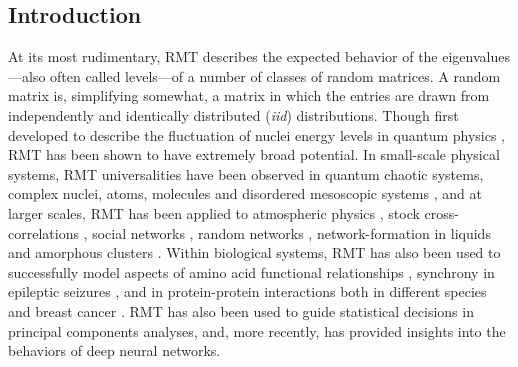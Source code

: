 \documentclass[12pt]{spieman}  %
\begin{document}
\begin{spacing}{2}

\section{Introduction}
\label{sect:intro}

At its most rudimentary, RMT describes the expected behavior of the
eigenvalues—also often called levels—of a number of classes of random
matrices\cite{andersonIntroductionRandomMatrices2010,
akemannOxfordHandbookRandom2011, mehtaRandomMatrices2004}. A random matrix is,
simplifying somewhat, a matrix in which the entries are drawn from
independently and identically distributed (\textit{iid}) distributions. Though
first developed to describe the fluctuation of nuclei energy levels in quantum
physics \cite{mehtaRandomMatrices2004, guhrRandommatrixTheoriesQuantum1998a},
RMT has been shown to have extremely broad potential. In small-scale physical
systems, RMT universalities have been observed in quantum chaotic systems,
complex nuclei, atoms, molecules and disordered mesoscopic systems
\cite{guhrRandommatrixTheoriesQuantum1998a, mehtaRandomMatrices2004,
brodyRandommatrixPhysicsSpectrum1981, beenakkerRandommatrixTheoryQuantum1997,
bohigasHigherOrderCorrelationsSpectra1985, wintgenLevelStatisticsQuantized1988,
pandeySkewOrthogonalPolynomialsUniversality2001}, and at larger scales, RMT has
been applied to atmospheric physics
\cite{santhanamStatisticsAtmosphericCorrelations2001}, stock cross-correlations
\cite{plerouRandomMatrixApproach2002}, social networks
\cite{jalanUncoveringRandomnessSuccess2014}, random networks
\cite{bandyopadhyayUniversalityComplexNetworks2007}, network-formation in
liquids\cite{sastrySpectralStatisticsInstantaneous2001,
matharooSpectralStatisticsQuenched2009} and amorphous clusters
\cite{sarkarUniversalityVibrationalSpectra2004,
matharooVibrationalSpectraAmorphous2005,
matharooUniversalityVibrationalSpectra2008}. Within biological systems, RMT has
also been used to successfully model aspects of  amino acid functional
relationships \cite{bhadolaTargetingFunctionalMotifs2016}, synchrony in
epileptic seizures \cite{osorioPhasesynchronizationRandommatrixBased2011}, and
in protein-protein interactions both in different species
\cite{agrawalQuantifyingRandomnessProtein2014} and breast cancer
\cite{raiRandomnessPreservedPatterns2015}. RMT has also been used to guide
statistical decisions in principal components
analyses\cite{franklinParallelAnalysisMethod1995,
veraartDenoisingDiffusionMRI2016, ulfarssonDimensionEstimationNoisy2008}, and,
more recently, has provided insights into the behaviors of deep neural
networks\cite{martinImplicitSelfRegularizationDeep2021,
martinPredictingTrendsQuality2021}.


\end{spacing}
\end{document}
